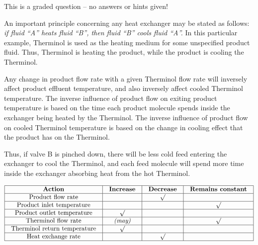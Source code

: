 \vfil 

\eject






This is a graded question -- no answers or hints given!







An important principle concerning any heat exchanger may be stated as follows: {\it if fluid ``A'' heats fluid ``B'', then fluid ``B'' cools fluid ``A''.}  In this particular example, Therminol is used as the heating medium for some unspecified product fluid.  Thus, Therminol is heating the product, while the product is cooling the Therminol.

\vskip 10pt

Any change in product flow rate with a given Therminol flow rate will inversely affect product effluent temperature, and also inversely affect cooled Therminol temperature.  The inverse influence of product flow on exiting product temperature is based on the time each product molecule spends inside the exchanger being heated by the Therminol.  The inverse influence of product flow on cooled Therminol temperature is based on the change in cooling effect that the product has on the Therminol.

Thus, if valve B is pinched down, there will be less cold feed entering the exchanger to cool the Therminol, and each feed molecule will spend more time inside the exchanger absorbing heat from the hot Therminol.


$$\vbox{\offinterlineskip
\halign{\strut
\vrule \quad\hfil # \ \hfil & 
\vrule \quad\hfil # \ \hfil & 
\vrule \quad\hfil # \ \hfil & 
\vrule \quad\hfil # \ \hfil \vrule \cr
\noalign{\hrule}
%
{\bf Action} & {\bf Increase} & {\bf Decrease} & {\bf Remains constant} \cr
%
\noalign{\hrule}
%
Product flow rate &  & $\surd$ &  \cr
%
\noalign{\hrule}
%
Product inlet temperature &  &  & $\surd$ \cr
%
\noalign{\hrule}
%
Product outlet temperature & $\surd$ &  &  \cr
%
\noalign{\hrule}
%
Therminol flow rate & {\it (may)} &  & $\surd$ \cr
%
\noalign{\hrule}
%
Therminol return temperature & $\surd$ &  &  \cr
%
\noalign{\hrule}
%
Heat exchange rate &  & $\surd$ &  \cr
%
\noalign{\hrule}
} %
}$$ %

